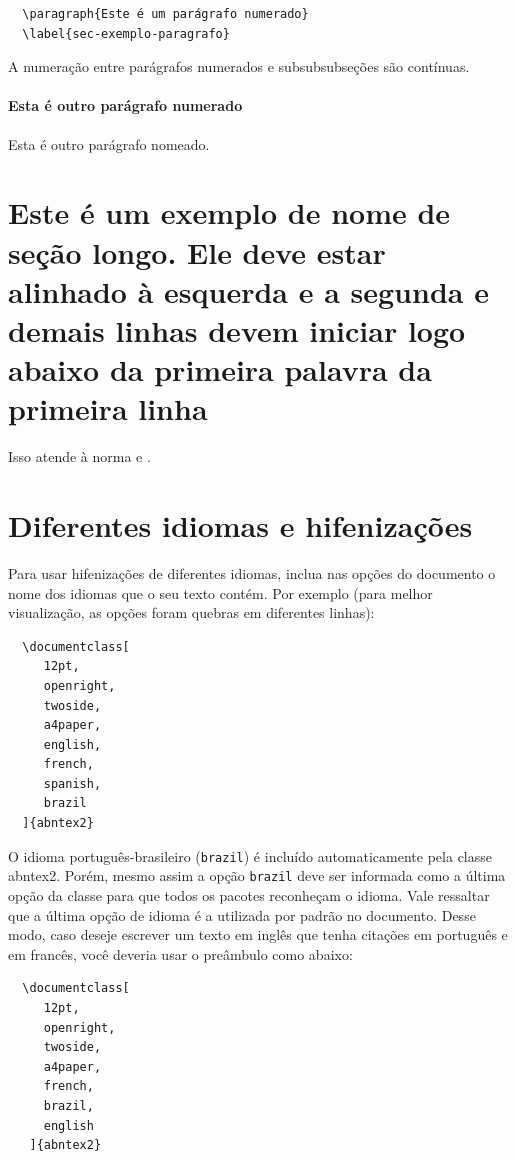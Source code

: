\documentclass[12pt,oneside,a4paper,chapter=TITLE,english,brazil]{abntex2}
\begin{document}
\begin{anexosenv}
\begin{verbatim}
  \paragraph{Este é um parágrafo numerado}
  \label{sec-exemplo-paragrafo}
\end{verbatim}

A numeração entre parágrafos numerados e subsubsubseções são contínuas.

\paragraph{Esta é outro parágrafo numerado}\label{sec-exemplo-paragrafo-outro}

Esta é outro parágrafo nomeado.

\section{Este é um exemplo de nome de seção longo. Ele deve estar alinhado à esquerda e a segunda e demais linhas devem iniciar logo abaixo da primeira palavra da primeira linha}

Isso atende à norma   e .

\section{Diferentes idiomas e hifenizações}
\label{sec-hifenizacao}

Para usar hifenizações de diferentes idiomas, inclua nas opções do documento o nome dos idiomas que o seu texto contém. Por exemplo (para melhor visualização, as opções foram quebras em diferentes linhas):
\begin{verbatim}
  \documentclass[
     12pt,
     openright,
     twoside,
     a4paper,
     english,
     french,
     spanish,
     brazil
  ]{abntex2}
\end{verbatim}

O idioma português-brasileiro (\texttt{brazil}) é incluído automaticamente pela classe \textsf{abntex2}. Porém, mesmo assim a opção \texttt{brazil} deve ser informada como a última opção da classe para que todos os pacotes reconheçam o idioma. Vale ressaltar que a última opção de idioma é a utilizada por padrão no documento. Desse modo, caso deseje escrever um texto em inglês que tenha citações em português e em francês, você deveria usar o preâmbulo como abaixo:
\begin{verbatim}
  \documentclass[
     12pt,
     openright,
     twoside,
     a4paper,
     french,
     brazil,
     english
   ]{abntex2}
\end{verbatim}


\end{anexosenv}
\end{document}
